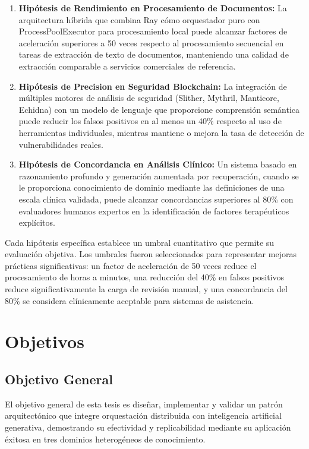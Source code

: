 \documentclass[12pt,a4paper,twoside]{book}
\begin{document}
\begin{enumerate}[label=\textbf{H\arabic*.}]
    \item \textbf{Hipótesis de Rendimiento en Procesamiento de Documentos:} La arquitectura híbrida que combina Ray cómo orquestador puro con ProcessPoolExecutor para procesamiento local puede alcanzar factores de aceleración superiores a 50 veces respecto al procesamiento secuencial en tareas de extracción de texto de documentos, manteniendo una calidad de extracción comparable a servicios comerciales de referencia.
    
    \item \textbf{Hipótesis de Precision en Seguridad Blockchain:} La integración de múltiples motores de análisis de seguridad (Slither, Mythril, Manticore, Echidna) con un modelo de lenguaje que proporcione comprensión semántica puede reducir los falsos positivos en al menos un 40\% respecto al uso de herramientas individuales, mientras mantiene o mejora la tasa de detección de vulnerabilidades reales.
    
    \item \textbf{Hipótesis de Concordancia en Análisis Clínico:} Un sistema basado en razonamiento profundo y generación aumentada por recuperación, cuando se le proporciona conocimiento de dominio mediante las definiciones de una escala clínica validada, puede alcanzar concordancias superiores al 80\% con evaluadores humanos expertos en la identificación de factores terapéuticos explícitos.
\end{enumerate}

Cada hipótesis específica establece un umbral cuantitativo que permite su evaluación objetiva. Los umbrales fueron seleccionados para representar mejoras prácticas significativas: un factor de aceleración de 50 veces reduce el procesamiento de horas a minutos, una reducción del 40\% en falsos positivos reduce significativamente la carga de revisión manual, y una concordancia del 80\% se considera clínicamente aceptable para sistemas de asistencia.

\section{Objetivos}

\subsection{Objetivo General}

El objetivo general de esta tesis es diseñar, implementar y validar un patrón arquitectónico que integre orquestación distribuida con inteligencia artificial generativa, demostrando su efectividad y replicabilidad mediante su aplicación éxitosa en tres dominios heterogéneos de conocimiento.
\end{document}
